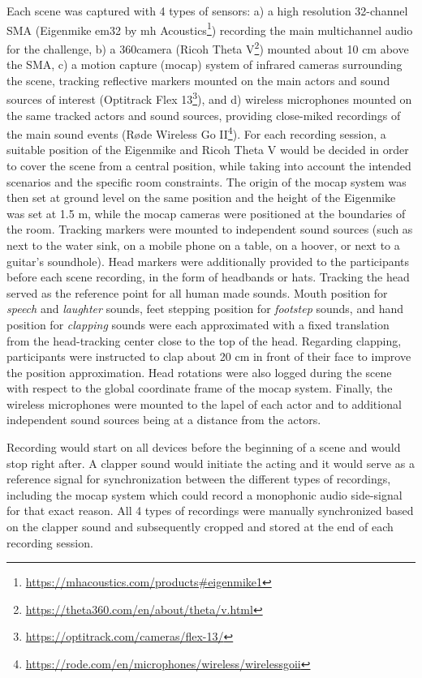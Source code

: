 \documentclass{article}
\begin{document}
\begin{sloppy}
Each scene was captured with 4 types of sensors: a) a high resolution 32-channel SMA (Eigenmike em32 by mh Acoustics\footnote{\url{https://mhacoustics.com/products#eigenmike1}}) recording the main multichannel audio for the challenge, b) a 360\degree camera (Ricoh Theta V\footnote{\url{https://theta360.com/en/about/theta/v.html}}) mounted about 10 cm above the SMA, c) a motion capture (mocap) system of infrared cameras surrounding the scene, tracking reflective markers mounted on the main actors and sound sources of interest (Optitrack Flex 13\footnote{\url{https://optitrack.com/cameras/flex-13/}}), and d) wireless microphones mounted on the same tracked actors and sound sources, providing close-miked recordings of the main sound events (R\o de Wireless Go II\footnote{\url{https://rode.com/en/microphones/wireless/wirelessgoii}}). For each recording session, a suitable position of the Eigenmike and Ricoh Theta V would be decided in order to cover the scene from a central position, while taking into account the intended scenarios and the specific room constraints. The origin of the mocap system was then set at ground level on the same position and the height of the Eigenmike was set at 1.5 m, while the mocap cameras were positioned at the boundaries of the room. Tracking markers were mounted to independent sound sources (such as next to the water sink, on a mobile phone on a table, on a hoover, or next to a guitar's soundhole). Head markers were additionally provided to the participants before each scene recording, in the form of headbands or hats. Tracking the head served as the reference point for all human made sounds. Mouth position for \emph{speech} and \emph{laughter} sounds, feet stepping position for \emph{footstep} sounds, and hand position for \emph{clapping} sounds were each approximated with a fixed translation from the head-tracking center close to the top of the head. Regarding clapping, participants were instructed to clap about 20 cm in front of their face to improve the position approximation. Head rotations were also logged during the scene with respect to the global coordinate frame of the mocap system. Finally, the wireless microphones were mounted to the lapel of each actor and to additional independent sound sources being at a distance from the actors. 

Recording would start on all devices before the beginning of a scene and would stop right after. A clapper sound would initiate the acting and it would serve as a reference signal for synchronization between the different types of recordings, including the mocap system which could record a monophonic audio side-signal for that exact reason. All 4 types of recordings were manually synchronized based on the clapper sound and subsequently cropped and stored at the end of each recording session.


\end{sloppy}
\end{document}
